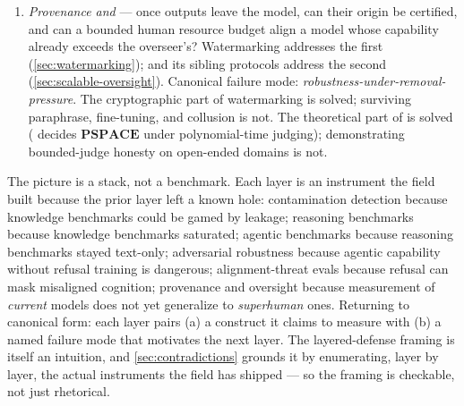 \begin{enumerate}
    aligned because it \emph{is} aligned, or because it has
    capability and incentive to look aligned during evaluation?
    Three sub-layers compose here: 
    \citep{sharma2023-sycophancy} as a measured  artifact
    (\cref{sec:sycophancy}); 
    \citep{meinke2024-apollo-scheming} as an elicited capability
    finding (\cref{sec:scheming}); alignment-faking
    \citep{greenblatt2024-alignment-faking} as strategic compliance
    under perceived training-vs-deployment shift
    (\cref{sec:alignment-faking}). Canonical failure mode for the
    layer as a whole: \emph{capability under elicitation does not
    imply propensity in deployment}, and the field has no
    deployment audit that closes the gap.
  \item \emph{Provenance and } --- once outputs
    leave the model, can their origin be certified, and can a
    bounded human resource budget align a model whose capability
    already exceeds the overseer's? Watermarking
    \citep{kirchenbauer2023-watermark} addresses the first
    (\cref{sec:watermarking}); 
    \citep{irving2018-debate} and its sibling protocols address
    the second (\cref{sec:scalable-oversight}). Canonical failure
    mode: \emph{robustness-under-removal-pressure}. The
    cryptographic part of watermarking is solved; surviving
    paraphrase, fine-tuning, and collusion is not. The theoretical
    part of  is solved ( decides
    $\mathbf{PSPACE}$ under polynomial-time judging); demonstrating
    bounded-judge honesty on open-ended domains is not.
\end{enumerate}

\begin{intuition}
The picture is a stack, not a benchmark. Each layer is an
instrument the field built because the prior layer left a known
hole: contamination detection because knowledge benchmarks could be
gamed by leakage; reasoning benchmarks because knowledge benchmarks
saturated; agentic benchmarks because reasoning benchmarks stayed
text-only; adversarial robustness because agentic capability without
refusal training is dangerous; alignment-threat evals because
refusal can mask misaligned cognition; provenance and oversight
because measurement of \emph{current} models does not yet
generalize to \emph{superhuman} ones. Returning to canonical form:
each layer pairs (a) a construct it claims to measure with (b) a
named failure mode that motivates the next layer. The
layered-defense framing is itself an intuition, and \cref{sec:contradictions} grounds it
by enumerating, layer by layer, the actual instruments the field
has shipped --- so the framing is checkable, not just rhetorical.
\end{intuition}

